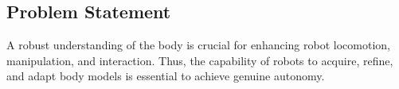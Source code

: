 \documentclass[12pt, a4paper]{article}
\newcommand{\redtext}[1]{\textcolor{red}{#1}}
\begin{document}
%
%
%
%

\newpage
\subsection*{Problem Statement}

A robust understanding of the body is crucial for enhancing robot locomotion, manipulation, and interaction. Thus, the capability of robots to acquire, refine, and adapt body models is essential to achieve genuine autonomy. 
\end{document}
